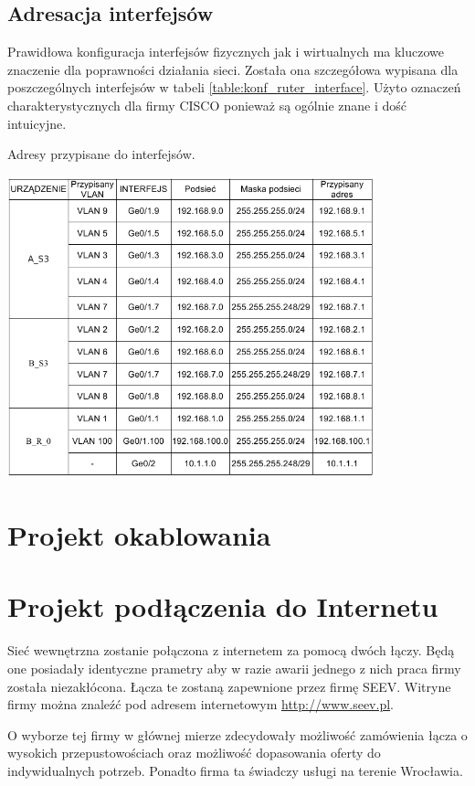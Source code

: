 \documentclass{report}
\begin{document}
\subsection{Adresacja interfejsów }
Prawidłowa konfiguracja interfejsów fizycznych jak i wirtualnych ma kluczowe znaczenie dla poprawności działania sieci. Została ona szczegółowa wypisana
dla poszczególnych interfejsów w tabeli \ref{table:konf_ruter_interface}. Użyto oznaczeń charakterystycznych dla firmy CISCO ponieważ są ogólnie znane i dość 
intuicyjne.
\begin{table}[H]
\caption{Adresy przypisane do interfejsów.}
\label{table:konf_ruter_interface}
 \centering
      \includegraphics[width=0.8\textwidth]{./obrazki/ip/ip_ruter.png}
\end{table}

\section{Projekt okablowania}


\section{Projekt podłączenia do Internetu}

Sieć wewnętrzna zostanie połączona z internetem za pomocą
dwóch łączy. Będą one posiadały identyczne prametry aby w razie awarii jednego z nich praca firmy została niezakłócona. Łącza te zostaną
zapewnione przez firmę SEEV. Witryne firmy można znaleźć pod adresem internetowym \url{http://www.seev.pl}.

O wyborze tej firmy w głównej mierze zdecydowały
możliwość zamówienia łącza o wysokich przepustowościach oraz możliwość dopasowania oferty do indywidualnych potrzeb.
Ponadto firma ta świadczy usługi na terenie Wrocławia. 
\end{document}
